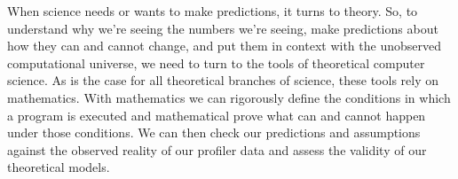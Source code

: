 \documentclass[]{tufte-handout}
\begin{document}
When science needs or wants to make predictions, it turns to theory. So, to understand why we're seeing the numbers we're seeing, make predictions about how they can and cannot change, and put them in context with the unobserved computational universe, we need to turn to the tools of theoretical computer science. As is the case for all theoretical branches of science, these tools rely on mathematics. With mathematics we can rigorously define the conditions in which a program is executed and mathematical prove what can and cannot happen under those conditions. We can then check our predictions and assumptions against the observed reality of our profiler data and assess the validity of our theoretical models.  
\end{document}
